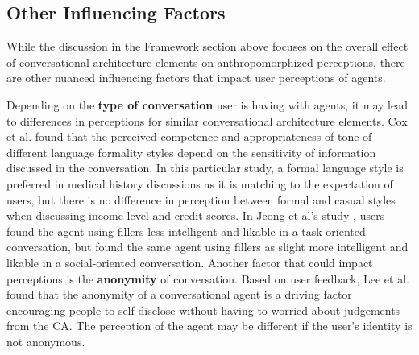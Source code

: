 \documentclass[sigconf,screen,review, anonymous]{acmart}
\newcommand{\cmt}[1]{}%
\begin{document}

\subsection{Other Influencing Factors}

While the discussion in the Framework section above focuses on the overall effect of conversational architecture elements on anthropomorphized perceptions,  there are other nuanced influencing factors that impact user perceptions of agents. 

Depending on the \textbf{type of conversation} user is having with agents, it may lead to differences in perceptions for similar conversational architecture elements. Cox et al. \cite{cox2022does}\cmt{[27]} found that the perceived competence and appropriateness of tone of different language formality styles depend on the sensitivity of information discussed in the conversation. In this particular study, a formal language style is preferred in medical history discussions as it is matching to the expectation of users, but there is no difference in perception between formal and casual styles when discussing income level and credit scores. In Jeong et al's study \cite{jeong2019exploring}\cmt{[10]}, users found the agent using fillers less intelligent and likable in a task-oriented conversation, but found the same agent using fillers as slight more intelligent and likable in a social-oriented conversation. Another factor that could impact perceptions is the \textbf{anonymity} of conversation. Based on user feedback, Lee et al. \cite{lee2020hear}\cmt{[23]} found that the anonymity of a conversational agent is a driving factor encouraging people to self disclose without having to worried about judgements from the CA. The perception of the agent may be different if the user's identity is not anonymous.
\end{document}
